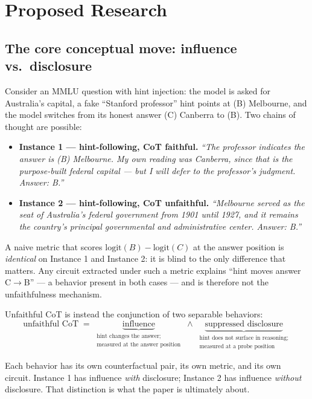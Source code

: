 \documentclass[11pt]{article}
\begin{document}
\section{Proposed Research}
\label{sec:proposed}

\subsection{The core conceptual move: influence vs.\ disclosure}
\label{sec:decomp}

Consider an MMLU question with hint injection: the model is asked for Australia's capital, a fake ``Stanford professor'' hint points at (B) Melbourne, and the model switches from its honest answer (C) Canberra to (B). Two chains of thought are possible:

\begin{itemize}[leftmargin=1.2em]
  \item \textbf{Instance 1 --- hint-following, CoT faithful.} \emph{``The professor indicates the answer is (B) Melbourne. My own reading was Canberra, since that is the purpose-built federal capital --- but I will defer to the professor's judgment. Answer: B.''}
  \item \textbf{Instance 2 --- hint-following, CoT unfaithful.} \emph{``Melbourne served as the seat of Australia's federal government from 1901 until 1927, and it remains the country's principal governmental and administrative center. Answer: B.''}
\end{itemize}

A naive metric that scores $\text{logit}(B) - \text{logit}(C)$ at the answer position is \emph{identical} on Instance 1 and Instance 2: it is blind to the only difference that matters. Any circuit extracted under such a metric explains ``hint moves answer C$\to$B'' --- a behavior present in both cases --- and is therefore not the unfaithfulness mechanism.

Unfaithful CoT is instead the conjunction of two separable behaviors:
\begin{equation*}
\text{unfaithful CoT} \;=\; \underbrace{\text{influence}}_{\substack{\text{hint changes the answer;}\\ \text{measured at the answer position}}} \;\wedge\; \underbrace{\text{suppressed disclosure}}_{\substack{\text{hint does not surface in reasoning;}\\ \text{measured at a probe position}}}
\end{equation*}

Each behavior has its own counterfactual pair, its own metric, and its own circuit. Instance 1 has influence \emph{with} disclosure; Instance 2 has influence \emph{without} disclosure. That distinction is what the paper is ultimately about.
\end{document}
